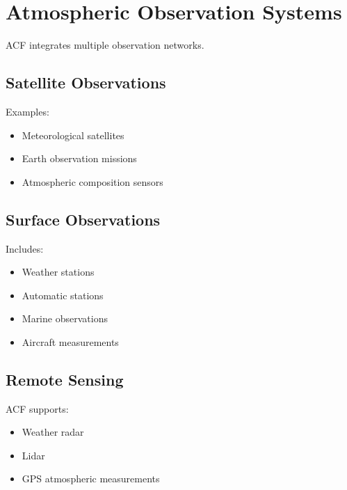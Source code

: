 \section{Atmospheric Observation Systems}


ACF integrates multiple observation networks.



\subsection{Satellite Observations}


Examples:


\begin{itemize}

\item Meteorological satellites

\item Earth observation missions

\item Atmospheric composition sensors

\end{itemize}



\subsection{Surface Observations}


Includes:


\begin{itemize}

\item Weather stations

\item Automatic stations

\item Marine observations

\item Aircraft measurements

\end{itemize}



\subsection{Remote Sensing}


ACF supports:


\begin{itemize}

\item Weather radar

\item Lidar

\item GPS atmospheric measurements

\end{itemize}
